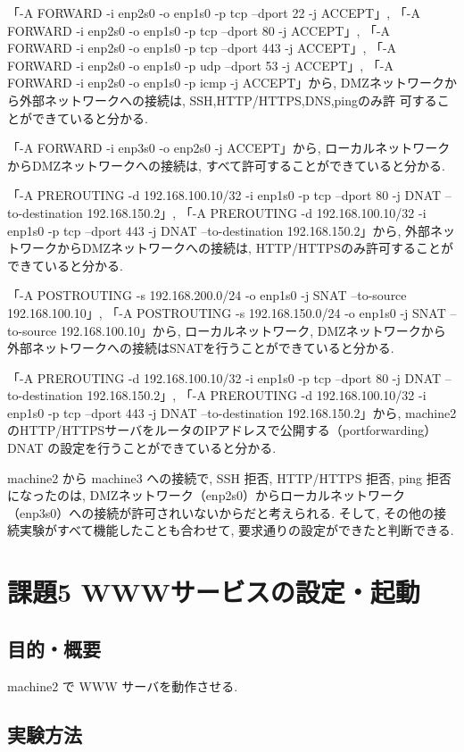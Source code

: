 \documentclass{ltjsarticle} %
\begin{document}
「-A FORWARD -i enp2s0 -o enp1s0 -p tcp --dport 22 -j ACCEPT」,
「-A FORWARD -i enp2s0 -o enp1s0 -p tcp --dport 80 -j ACCEPT」,
「-A FORWARD -i enp2s0 -o enp1s0 -p tcp --dport 443 -j ACCEPT」,
「-A FORWARD -i enp2s0 -o enp1s0 -p udp --dport 53 -j ACCEPT」,
「-A FORWARD -i enp2s0 -o enp1s0 -p icmp -j ACCEPT」から,
DMZネットワークから外部ネットワークへの接続は, SSH,HTTP/HTTPS,DNS,pingのみ許
可することができていると分かる. 

「-A FORWARD -i enp3s0 -o enp2s0 -j ACCEPT」から, 
ローカルネットワークからDMZネットワークへの接続は, すべて許可することができていると分かる. 

「-A PREROUTING -d 192.168.100.10/32 -i enp1s0 -p tcp --dport 80 -j DNAT --to-destination 192.168.150.2」,
「-A PREROUTING -d 192.168.100.10/32 -i enp1s0 -p tcp --dport 443 -j DNAT --to-destination 192.168.150.2」から,
外部ネットワークからDMZネットワークへの接続は, HTTP/HTTPSのみ許可することができていると分かる. 

「-A POSTROUTING -s 192.168.200.0/24 -o enp1s0 -j SNAT --to-source 192.168.100.10」,
「-A POSTROUTING -s 192.168.150.0/24 -o enp1s0 -j SNAT --to-source 192.168.100.10」から, 
ローカルネットワーク, DMZネットワークから外部ネットワークへの接続はSNATを行うことができていると分かる. 

「-A PREROUTING -d 192.168.100.10/32 -i enp1s0 -p tcp --dport 80 -j DNAT --to-destination 192.168.150.2」,
「-A PREROUTING -d 192.168.100.10/32 -i enp1s0 -p tcp --dport 443 -j DNAT --to-destination 192.168.150.2」から, 
machine2のHTTP/HTTPSサーバをルータのIPアドレスで公開する（portforwarding）DNAT
の設定を行うことができていると分かる. 

machine2 から machine3 への接続で, SSH 拒否, HTTP/HTTPS 拒否, ping 拒否になったのは, 
DMZネットワーク（enp2s0）からローカルネットワーク（enp3s0）への接続が許可されいないからだと考えられる. 
そして, その他の接続実験がすべて機能したことも合わせて, 要求通りの設定ができたと判断できる. 


\section{課題5 WWWサービスの設定・起動}

\subsection{目的・概要}
machine2 で WWW サーバを動作させる. 

\subsection{実験方法}
\end{document}
